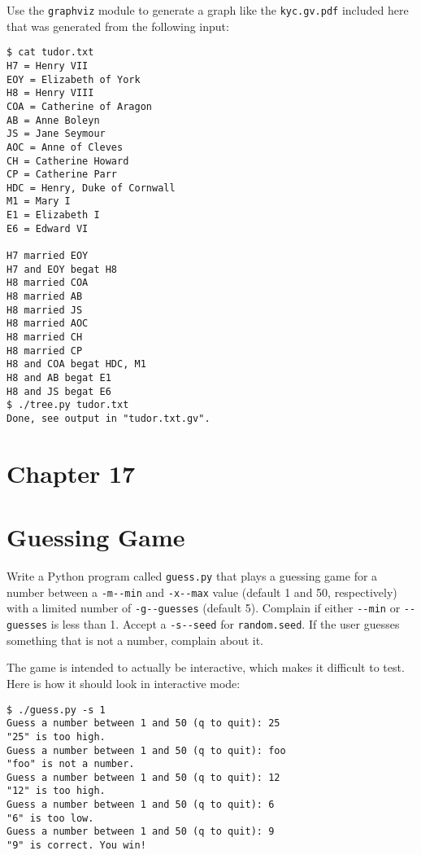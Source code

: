 \documentclass[]{article}
\begin{document}
Use the \texttt{graphviz} module to generate a graph like the
\texttt{kyc.gv.pdf} included here that was generated from the following
input:

\begin{verbatim}
$ cat tudor.txt
H7 = Henry VII
EOY = Elizabeth of York
H8 = Henry VIII
COA = Catherine of Aragon
AB = Anne Boleyn
JS = Jane Seymour
AOC = Anne of Cleves
CH = Catherine Howard
CP = Catherine Parr
HDC = Henry, Duke of Cornwall
M1 = Mary I
E1 = Elizabeth I
E6 = Edward VI

H7 married EOY
H7 and EOY begat H8
H8 married COA
H8 married AB
H8 married JS
H8 married AOC
H8 married CH
H8 married CP
H8 and COA begat HDC, M1
H8 and AB begat E1
H8 and JS begat E6
$ ./tree.py tudor.txt
Done, see output in "tudor.txt.gv".
\end{verbatim}

\pagebreak

\hypertarget{chapter-17}{%
\section{Chapter 17}\label{chapter-17}}

\hypertarget{guessing-game}{%
\section{Guessing Game}\label{guessing-game}}

Write a Python program called \texttt{guess.py} that plays a guessing
game for a number between a \texttt{-m\textbar{}-\/-min} and
\texttt{-x\textbar{}-\/-max} value (default 1 and 50, respectively) with
a limited number of \texttt{-g\textbar{}-\/-guesses} (default 5).
Complain if either \texttt{-\/-min} or \texttt{-\/-guesses} is less than
1. Accept a \texttt{-s\textbar{}-\/-seed} for \texttt{random.seed}. If
the user guesses something that is not a number, complain about it.

The game is intended to actually be interactive, which makes it
difficult to test. Here is how it should look in interactive mode:

\begin{verbatim}
$ ./guess.py -s 1
Guess a number between 1 and 50 (q to quit): 25
"25" is too high.
Guess a number between 1 and 50 (q to quit): foo
"foo" is not a number.
Guess a number between 1 and 50 (q to quit): 12
"12" is too high.
Guess a number between 1 and 50 (q to quit): 6
"6" is too low.
Guess a number between 1 and 50 (q to quit): 9
"9" is correct. You win!
\end{verbatim}
\end{document}
